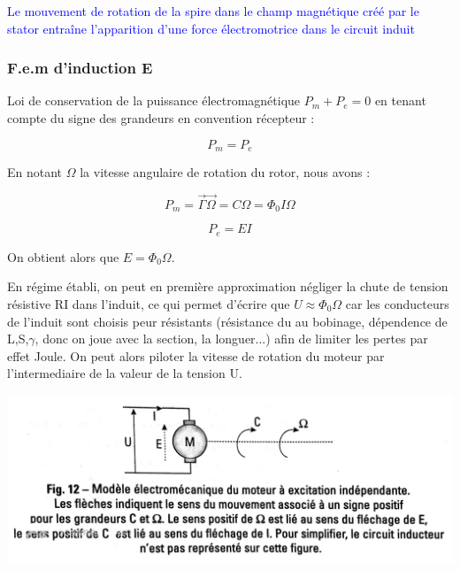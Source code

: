 \documentclass{article}
\begin{document}
\textcolor{blue}{Le mouvement de rotation de la spire dans le champ magnétique créé par le stator entraîne l'apparition d'une force électromotrice dans le circuit induit}


\subsubsection*{F.e.m d'induction E}

Loi de conservation de la puissance électromagnétique $P_m + P_e =0$ en tenant compte du signe des grandeurs en convention récepteur :

\begin{equation}
    P_m = P_e
\end{equation}

En notant $\Omega$ la vitesse angulaire de rotation du rotor, nous avons :

\begin{equation}
    P_m = \vec{\Gamma}\vec{\Omega}= C \Omega = \Phi_0 I \Omega
\end{equation}

\begin{equation}
    P_e = EI
\end{equation}

On obtient alors que $E= \Phi_0 \Omega$. \medskip

En régime établi, on peut en première approximation négliger la chute de tension résistive RI dans l'induit, ce qui permet d'écrire que $U \approx \Phi_0 \Omega$ car les conducteurs de l'induit sont choisis peur résistants (résistance du au bobinage, dépendence de L,S,$\gamma$, donc on joue avec la section, la longuer...) afin de limiter les pertes par effet Joule. On peut alors piloter la vitesse de rotation du moteur par l'intermediaire de la valeur de la tension U.


\begin{center}
    \includegraphics[scale=0.14]{convention.jpg}
\end{center}
\end{document}
